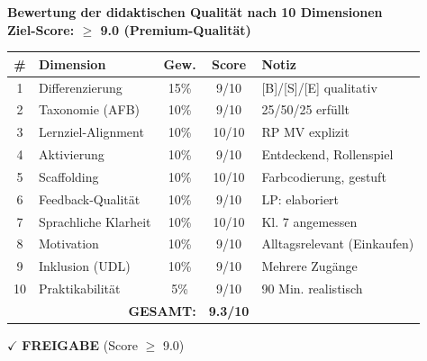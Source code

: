 \documentclass[11pt,a4paper]{article}
\begin{document}
\begin{scorebox}
\textbf{Bewertung der didaktischen Qualität nach 10 Dimensionen}\\
\textbf{Ziel-Score: $\geq$ 9.0 (Premium-Qualität)}

\vspace{1em}
\begin{tabular}{|c|l|c|c|p{4cm}|}
\hline
\textbf{\#} & \textbf{Dimension} & \textbf{Gew.} & \textbf{Score} & \textbf{Notiz} \\
\hline
1 & Differenzierung & 15\% & 9/10 & [B]/[S]/[E] qualitativ \\
\hline
2 & Taxonomie (AFB) & 10\% & 9/10 & 25/50/25 erfüllt \\
\hline
3 & Lernziel-Alignment & 10\% & 10/10 & RP MV explizit \\
\hline
4 & Aktivierung & 10\% & 9/10 & Entdeckend, Rollenspiel \\
\hline
5 & Scaffolding & 10\% & 10/10 & Farbcodierung, gestuft \\
\hline
6 & Feedback-Qualität & 10\% & 9/10 & LP: elaboriert \\
\hline
7 & Sprachliche Klarheit & 10\% & 10/10 & Kl. 7 angemessen \\
\hline
8 & Motivation & 10\% & 9/10 & Alltagsrelevant (Einkaufen) \\
\hline
9 & Inklusion (UDL) & 10\% & 9/10 & Mehrere Zugänge \\
\hline
10 & Praktikabilität & 5\% & 9/10 & 90 Min. realistisch \\
\hline
\multicolumn{3}{|r|}{\textbf{GESAMT:}} & \textbf{9.3/10} & \\
\hline
\end{tabular}

\vspace{1em}
$\checkmark$ \textcolor{successgreen}{\textbf{FREIGABE} (Score $\geq$ 9.0)}
\end{scorebox}
\end{document}
